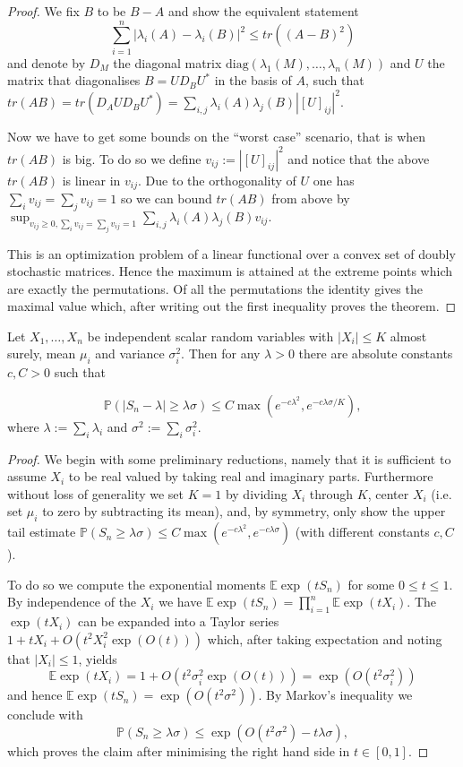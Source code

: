 \begin{proof}
	We fix $B$ to be $B-A$ and show the equivalent statement $$\sum_{i=1}^n |\lambda_i(A)-\lambda_i(B)|^2\leq tr\left((A-B)^2\right)$$
	and denote by $D_M$ the diagonal matrix $\text{diag}(\lambda_1(M),\dots,\lambda_n(M))$ and $U$ the matrix that diagonalises $B=UD_BU^*$ in the basis of $A$, such that $tr(AB)=tr(D_A U D_B U^*)=\sum_{i,j}\lambda_i(A)\lambda_j(B)|[U]_{ij}|^2.$
	
	Now we have to get some bounds on the ``worst case'' scenario, that is when $tr(AB)$ is big. To do so we define $v_{ij}:=|[U]_{ij}|^2$ and notice that the above $tr(AB)$ is linear in $v_{ij}$. Due to the orthogonality of $U$ one has $\sum_i v_{ij}=\sum_j v_{ij}=1$ so we can bound $tr(AB)$ from above by $\sup_{v_{ij}\geq 0,\sum_i v_{ij}=\sum_j v_{ij}=1}\sum_{i,j}\lambda_i(A)\lambda_j(B)v_{ij}.$
	
	This is an optimization problem of a linear functional over a convex set of doubly stochastic matrices. Hence the maximum is attained at the extreme points which are exactly the permutations. Of all the permutations the identity gives the maximal value which, after writing out the first inequality proves the theorem.
\end{proof}

\begin{theorem}
	Let $X_1,\dots,X_n$ be independent scalar random variables with $|X_i|\leq K$ almost surely, mean $\mu_i$ and variance $\sigma_i^2$. Then for any $\lambda>0$ there are absolute constants $c,C>0$ such that 
	
	$$\mathbb P(|S_n-\lambda|\geq\lambda\sigma)\leq C\max(e^{-c\lambda^2}, e^{-c\lambda\sigma/K}),$$
	where $\lambda:=\sum_i \lambda_i$ and $\sigma^2:=\sum_i \sigma_i^2$.
\end{theorem}
\begin{proof}
	We begin with some preliminary reductions, namely that it is sufficient to assume $X_i$ to be real valued by taking real and imaginary parts. Furthermore without loss of generality we set $K=1$ by dividing $X_i$ through $K$, center $X_i$ (i.e. set $\mu_i$ to zero by subtracting its mean), and, by symmetry, only show the upper tail estimate $\mathbb P(S_n\geq\lambda\sigma)\leq C\max(e^{-c\lambda^2}, e^{-c\lambda\sigma})$ (with different constants $c,C$).
	
	To do so we compute the exponential moments $\mathbb E \exp(tS_n)$ for some $0\leq t\leq 1$. By independence of the $X_i$ we have $\mathbb E \exp(tS_n)=\prod_{i=1}^n \mathbb E \exp(tX_i)$. The $\exp(tX_i)$ can be expanded into a Taylor series $1+tX_i+O(t^2X_i^2\exp(O(t)))$ which, after taking expectation and noting that $|X_i|\leq 1$, yields
	$$\mathbb E\exp(tX_i)=1+O(t^2\sigma_i^2\exp(O(t)))=\exp(O(t^2\sigma_i^2))$$
	and hence $\mathbb E\exp(tS_n)=\exp(O(t^2\sigma^2))$. By Markov's inequality we conclude with $$\mathbb P(S_n\geq\lambda\sigma)\leq\exp(O(t^2\sigma^2)-t\lambda\sigma),$$ which proves the claim after minimising the right hand side in $t\in[0,1]$.
\end{proof}

